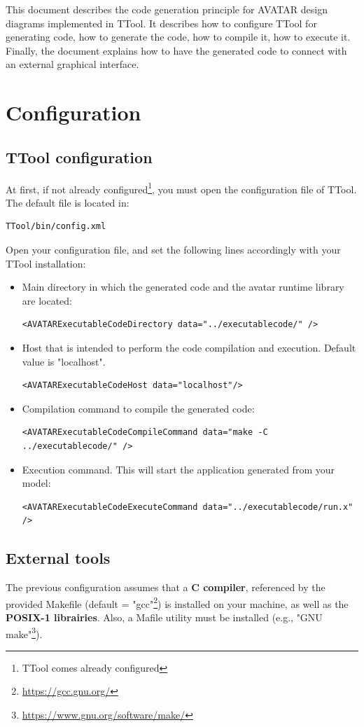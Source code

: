 \documentclass[12pt]{article}
\begin{document}
This document describes the code generation principle for AVATAR design diagrams implemented in TTool. It describes how to configure TTool for generating code, how to generate the code, how to compile it, how to execute it.
Finally, the document explains how to have the generated code to connect with an external graphical interface.

\newpage

\section{Configuration}\label{sec:conf}
\subsection{TTool configuration}
At first, if not already configured\footnote{TTool comes already configured}, you must open the configuration file of TTool. The default file is located in:
\begin{verbatim}
TTool/bin/config.xml
\end{verbatim}
Open your configuration file, and set the following lines accordingly with your TTool installation:
\begin{itemize}
\item Main directory in which the generated code and the avatar runtime library are located:
\begin{verbatim}
<AVATARExecutableCodeDirectory data="../executablecode/" />
\end{verbatim}
\item Host that is intended to perform the code compilation and execution. Default value is "localhost".
\begin{verbatim}
<AVATARExecutableCodeHost data="localhost"/>
\end{verbatim}
\item Compilation command to compile the generated code:
\begin{verbatim}
<AVATARExecutableCodeCompileCommand data="make -C ../executablecode/" />
\end{verbatim}
\item Execution command. This will start the application generated from your model:
\begin{verbatim}
<AVATARExecutableCodeExecuteCommand data="../executablecode/run.x" />
\end{verbatim}
\end{itemize}

\subsection{External tools}
The previous configuration assumes that a \textbf{C compiler}, referenced by the provided Makefile (default = "gcc"\footnote{\url{https://gcc.gnu.org/}}) is installed on your machine, as well as the \textbf{POSIX-1 librairies}. Also, a Mafile utility must be installed (e.g., "GNU make"\footnote{\url{https://www.gnu.org/software/make/}}).
\end{document}

